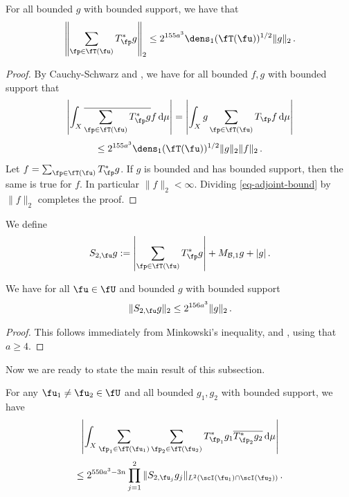 \begin{lemma}
    \label{adjoint-tree-estimate}
    \leanok
    For all bounded $g$ with bounded support, we have that
    $$
        \left\| \sum_{\fp \in \fT(\fu)} T_{\fp}^* g\right\|_2 \le 2^{155a^3} \dens_1(\fT(\fu))^{1/2} \|g\|_2\,.
    $$
\end{lemma}

\begin{proof}
    By Cauchy-Schwarz and , we have for all bounded $f,g$ with bounded support that
    $$
        \left| \int_X \overline{\sum_{\fp\in \fT(\fu)} T_{\fp}^* g} f \,\mathrm{d}\mu \right| = \left| \int_X g \sum_{\fp \in \fT(\fu)} T_{\fp} f \,\mathrm{d}\mu \right|
    $$
    \begin{equation}
        \label{eq-adjoint-bound}
        \le 2^{155a^3} \dens_1(\fT(\fu))^{1/2} \|g\|_2 \|f\|_2\,.
    \end{equation}
    Let $f = \sum_{\fp \in \fT(\fu)} T_{\fp}^* g$. If $g$ is bounded and has bounded support, then the same is true for $f$. In particular $\|f\|_2 < \infty$. Dividing \eqref{eq-adjoint-bound} by $\|f\|_2$ completes the proof.
\end{proof}

We define
$$
    S_{2,\fu}g := \left|\sum_{\fp \in \fT(\fu)} T_{\fp}^*g \right| + M_{\mathcal{B},1}g + |g|\,.
$$
\begin{lemma}
    \label{adjoint-tree-control}
    \leanok
    We have for all $\fu \in \fU$ and bounded $g$ with bounded support
    $$
        \|S_{2, \fu} g\|_2 \le 2^{156a^3} \|g\|_2\,.
    $$
\end{lemma}

\begin{proof}
    \leanok
    This follows immediately from Minkowski's inequality,  and , using that $a \ge 4$.
\end{proof}


Now we are ready to state the main result of this subsection.

\begin{lemma}
    \label{correlation-separated-trees}
    \leanok
    For any $\fu_1 \ne \fu_2 \in \fU$ and all bounded $g_1, g_2$ with bounded support, we have
    \begin{equation}
        \label{eq-lhs-sep-tree}
        \left| \int_X \sum_{\fp_1 \in \fT(\fu_1)} \sum_{\fp_2 \in \fT(\fu_2)} T^*_{\fp_1}g_1 \overline{T^*_{\fp_2}g_2 }\,\mathrm{d}\mu \right|
    \end{equation}
    \begin{equation}
        \label{eq-rhs-sep-tree}
        \le 2^{550a^3-3n} \prod_{j =1}^2 \| S_{2, \fu_j} g_j\|_{L^2(\scI(\fu_1) \cap \scI(\fu_2))}\,.
    \end{equation}
\end{lemma}

